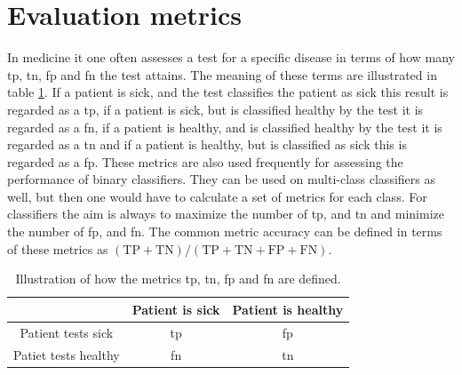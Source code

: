 \section{Evaluation metrics} \label{sec:eval_metrics}
In medicine it one often assesses a test for a specific disease in terms of how many \acrfull{tp}, \acrfull{tn}, \acrfull{fp} and \acrfull{fn} the test attains. The meaning of these terms are illustrated in table \ref{tab:ttpnffpn}. If a patient is sick, and the test classifies the patient as sick this result is regarded as a \acrlong{tp}, if a patient is sick, but is classified healthy by the test it is regarded as a \acrlong{fn}, if a patient is healthy, and is classified healthy by the test it is regarded as a \acrlong{tn} and if a patient is healthy, but is classified as sick this is regarded as a \acrlong{fp}. These metrics are also used frequently for assessing the performance of binary classifiers. They can be used on multi-class classifiers as well, but then one would have to calculate a set of metrics for each class. For classifiers the aim is always to maximize the number of \acrshort{tp}, and \acrshort{tn} and minimize the number of \acrshort{fp}, and \acrshort{fn}. The common metric accuracy can be defined in terms of these metrics as $(\mathrm{TP} + \mathrm{TN}) / (\mathrm{TP} + \mathrm{TN} + \mathrm{FP} + \mathrm{FN})$.

\begin{table}
    \centering
    \begin{tabular}{c|c|c|}
        \toprule
                             & Patient is sick & Patient is healthy \\
        \midrule
        Patient tests sick   & \acrshort{tp}   & \acrshort{fp} \\
        \midrule
        Patiet tests healthy & \acrshort{fn}   & \acrshort{tn} \\
        \bottomrule
    \end{tabular}
    \caption{Illustration of how the metrics \acrshort{tp}, \acrshort{tn}, \acrfull{fp} and \acrfull{fn} are defined.}
    \label{tab:ttpnffpn}
\end{table}

